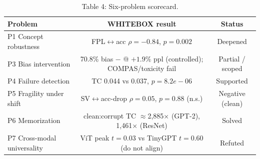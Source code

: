 \begin{table}[t]
\centering
\begin{tabular}{lcc}
\toprule
Problem & WHITEBOX result & Status \\
\midrule
P1 Concept robustness & FPL$\leftrightarrow$acc $\rho=-0.84$, $p=0.002$ & Deepened \\
P3 Bias intervention & 70.8\% bias $-$ @ $+1.9\%$ ppl (controlled); COMPAS/toxicity fail & Partial / scoped \\
P4 Failure detection & TC 0.044 vs 0.037, $p=8.2e-06$ & Supported \\
P5 Fragility under shift & SV$\leftrightarrow$acc-drop $\rho=0.05$, $p=0.88$ (n.s.) & Negative (clean) \\
P6 Memorization & clean:corrupt TC $\approx$2,885$\times$ (GPT-2), 1,461$\times$ (ResNet) & Solved \\
P7 Cross-modal universality & ViT peak $t=0.03$ vs TinyGPT $t=0.60$ (do not align) & Refuted \\
\bottomrule
\end{tabular}
\caption{Table 4: Six-problem scorecard.}
\end{table}


